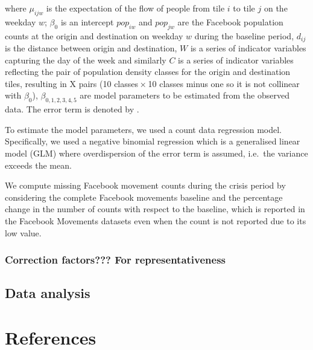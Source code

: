 \documentclass[
  11pt,
]{article}
\begin{document}
where \(\mu_{ijw}\) is the expectation of the flow of people from tile
\(i\) to tile \(j\) on the weekday \(w\); \(\beta_0\) is an intercept
\(pop_{iw}\) and \(pop_{jw}\) are the Facebook population counts at the
origin and destination on weekday \(w\) during the baseline period,
\(d_{ij}\) is the distance between origin and destination, \(W\) is a
series of indicator variables capturing the day of the week and
similarly \(C\) is a series of indicator variables reflecting the pair
of population density classes for the origin and destination tiles,
resulting in X pairs (10 classes × 10 classes minus one so it is not
collinear with \(\beta_0\)), \(\beta_{0,1,2,3,4,5}\) are model
parameters to be estimated from the observed data. The error term is
denoted by \varepsilon.

To estimate the model parameters, we used a count data regression model.
Specifically, we used a negative binomial regression which is a
generalised linear model (GLM) where overdispersion of the error term is
assumed, i.e.~the variance exceeds the mean.

We compute missing Facebook movement counts during the crisis period by
considering the complete Facebook movements baseline and the percentage
change in the number of counts with respect to the baseline, which is
reported in the Facebook Movements datasets even when the count is not
reported due to its low value.

\subsubsection{Correction factors??? For
representativeness}\label{correction-factors-for-representativeness}

\subsection{Data analysis}\label{data-analysis}

\section*{References}\label{references}
\end{document}
